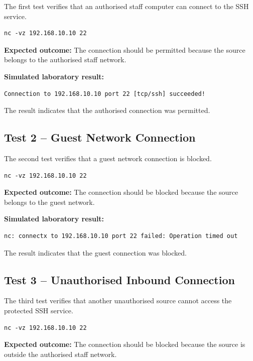 \documentclass[12pt,a4paper]{article}
\begin{document}
The first test verifies that an authorised staff computer can connect to
the SSH service.

\begin{lstlisting}
nc -vz 192.168.10.10 22
\end{lstlisting}

\textbf{Expected outcome:} The connection should be permitted because
the source belongs to the authorised staff network.

\textbf{Simulated laboratory result:}

\begin{lstlisting}
Connection to 192.168.10.10 port 22 [tcp/ssh] succeeded!
\end{lstlisting}

The result indicates that the authorised connection was permitted.

\subsection{Test 2 -- Guest Network Connection}

The second test verifies that a guest network connection is blocked.

\begin{lstlisting}
nc -vz 192.168.10.10 22
\end{lstlisting}

\textbf{Expected outcome:} The connection should be blocked because the
source belongs to the guest network.

\textbf{Simulated laboratory result:}

\begin{lstlisting}
nc: connectx to 192.168.10.10 port 22 failed: Operation timed out
\end{lstlisting}

The result indicates that the guest connection was blocked.

\subsection{Test 3 -- Unauthorised Inbound Connection}

The third test verifies that another unauthorised source cannot access
the protected SSH service.

\begin{lstlisting}
nc -vz 192.168.10.10 22
\end{lstlisting}

\textbf{Expected outcome:} The connection should be blocked because the
source is outside the authorised staff network.
\end{document}
